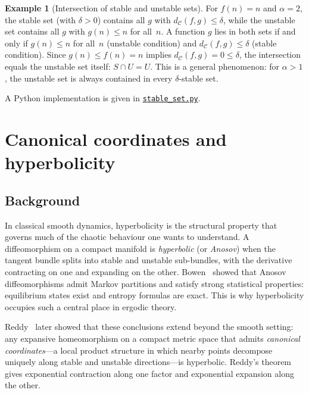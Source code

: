 \documentclass[11pt,a4paper]{article}
\newcommand{\repourl}{https://github.com/gabayae/expansive-homeomorphisms-complexity-qmetric}
\theoremstyle{plain}
\theoremstyle{definition}
\newtheorem{exampleinner}[theoreminner]{Example}
\newenvironment{example}[1][]{\begin{exampleinner}[#1]}{\end{exampleinner}}
\newcommand{\C}{\mathcal{C}}
\begin{document}
\begin{example}[Intersection of stable and unstable sets]\label{ex:stable-unstable-intersect}
For $f(n)=n$ and $\alpha=2$, the stable set (with $\delta>0$)
contains all $g$ with $d_\C(f,g)\le\delta$, while the unstable set
contains all $g$ with $g(n)\le n$ for all~$n$.  A function $g$
lies in both sets if and only if $g(n)\le n$ for all~$n$ (unstable
condition) and $d_\C(f,g)\le\delta$ (stable condition).  Since
$g(n)\le f(n)=n$ implies $d_\C(f,g)=0\le\delta$, the intersection
equals the unstable set itself: $S\cap U = U$.  This is a general
phenomenon: for $\alpha>1$, the unstable set is always contained
in every $\delta$-stable set.
\end{example}

A Python implementation is given in
\href{\repourl/blob/main/code/python/stable_set.py}{\texttt{stable\_set.py}}.


\section{Canonical coordinates and hyperbolicity}
\label{sec:hyperbolicity}

\subsection{Background}

In classical smooth dynamics, hyperbolicity is the structural
property that governs much of the chaotic behaviour one wants to
understand.  A diffeomorphism on a compact manifold is
\emph{hyperbolic} (or \emph{Anosov}) when the tangent bundle
splits into stable and unstable sub-bundles, with the derivative
contracting on one and expanding on the other.
Bowen~\cite{bowen1975} showed that Anosov diffeomorphisms admit
Markov partitions and satisfy strong statistical properties:
equilibrium states exist and entropy formulas are exact.  This is
why hyperbolicity occupies such a central place in ergodic theory.

Reddy~\cite{reddy1983} later showed that these conclusions extend
beyond the smooth setting: any expansive homeomorphism on a
compact metric space that admits \emph{canonical coordinates}---a
local product structure in which nearby points decompose uniquely
along stable and unstable directions---is hyperbolic.  Reddy's
theorem gives exponential contraction along one factor and
exponential expansion along the other.
\end{document}
